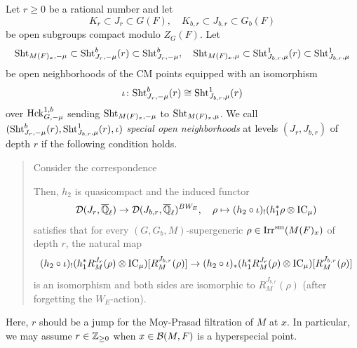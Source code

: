 \documentclass[12pt,reqno]{amsart}
\begin{document}
\begin{defi} \label{defi:special_open_neighborhoods}
    Let $r \geq 0$ be a rational number and let 
    \[  
        K_r \subset J_r \subset G(F), \quad K_{b, r} \subset J_{b, r} \subset G_b(F)
    \]
    be open subgroups compact modulo $Z_G(F)$. Let 
    \[
        {\operatorname{Sht}}_{M(F)_x, -\mu} \subset {\operatorname{Sht}}_{J_r, -\mu}^b(r) \subset {\operatorname{Sht}}_{J_r, -\mu}^b ,\quad 
        {\operatorname{Sht}}_{M(F)_x, \mu} \subset {\operatorname{Sht}}_{J_{b, r}, \mu}^1(r) \subset {\operatorname{Sht}}_{J_{b, r}, \mu}^1
    \]
    be open neighborhoods of the CM points equipped with an isomorphism 
    \[
        \iota \colon {\operatorname{Sht}}_{J_r, -\mu}^b(r) \cong {\operatorname{Sht}}_{J_{b, r}, \mu}^1(r)
    \]
    over ${\operatorname{Hck}}_{G, -\mu}^{1, b}$ sending ${\operatorname{Sht}}_{M(F)_x, -\mu}$ to ${\operatorname{Sht}}_{M(F)_x, \mu}$. We call $({\operatorname{Sht}}_{J_r, -\mu}^b(r), {\operatorname{Sht}}_{J_{b, r}, \mu}^1(r), \iota)$ \textit{special open neighborhoods} at levels $(J_r, J_{b, r})$ of depth $r$ if the following condition holds. 
    \begin{quote}
        Consider the correspondence
        \begin{center}
        \end{center}
        Then, $h_2$ is quasicompact and the induced functor 
        \[
            {\mathcal{D}}(J_r, {\overline{\mathbb{Q}}_\ell}) \to {\mathcal{D}}(J_{b, r}, {\overline{\mathbb{Q}}_\ell})^{BW_E}, \quad \rho \mapsto (h_2 \circ \iota)_! (h_1^*\rho \otimes {\operatorname{IC}}_\mu)
        \]
        satisfies that for every $(G, G_b, M)$-supergeneric $\rho \in {\operatorname{Irr}}^{\operatorname{sm}}(M(F)_{x})$ of depth $r$, the natural map 
        \begin{equation} \label{eq:condition_2_question}
            (h_2 \circ \iota)_! (h_1^*R^{J_r}_M(\rho) \otimes {\operatorname{IC}}_\mu)[R^{J_{b, r}}_M(\rho)] \to (h_2 \circ \iota)_* (h_1^*R^{J_r}_M(\rho) \otimes {\operatorname{IC}}_\mu)[R^{J_{b, r}}_M(\rho)]
        \end{equation}
        is an isomorphism and both sides are isomorphic to $R^{J_{b, r}}_M(\rho)$ (after forgetting the $W_E$-action). 
    \end{quote}
\end{defi}
\begin{rmk} \label{rmk:restriction_to_jumps}
    Here, $r$ should be a jump for the Moy-Prasad filtration of $M$ at $x$. In particular, we may assume $r \in \mathbb{Z}_{\geq 0}$ when $x \in {\mathcal{B}}(M, F)$ is a hyperspecial point. 
\end{rmk}
\end{document}
